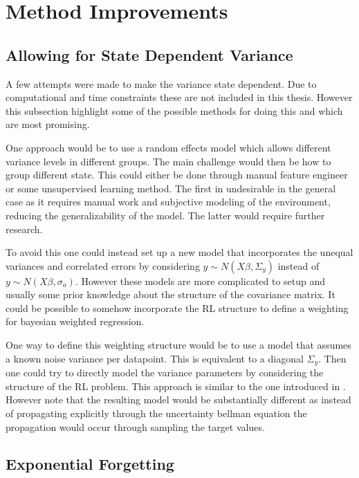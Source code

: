 \section{Method Improvements}

\subsection{Allowing for State Dependent Variance}

A few attempts were made to make the variance state dependent. Due to computational and time constraints these are not included in this thesis. However this subsection highlight some of the possible methods for doing this and which are most promising.

One approach would be to use a random effects model\citep[p.~382-383]{gelman_2013} which allows different variance levels in different groups. The main challenge would then be how to group different state. This could either be done through manual feature engineer or some unsupervised learning method. The first in undesirable in the general case as it requires manual work and subjective modeling of the environment, reducing the generalizability of the model. The latter would require further research.

To avoid this one could instead set up a new model that incorporates the unequal variances and correlated errors by considering $y \sim N(X\beta, \Sigma_y)$ instead of $y \sim N(X\beta, \sigma_a)$.  However these models are more complicated to setup and usually some prior knowledge about the structure of the covariance matrix. It could be possible to somehow incorporate the RL structure to define a weighting for bayesian weighted regression\citep[p.~370-373]{gelman_2013}. 

One way to define this weighting structure would be to use a model that assumes a known noise variance per datapoint. This is equivalent to a diagonal $\Sigma_y$. Then one could try to directly model the variance parameters by considering the structure of the RL problem. This approach is similar to the one introduced in \cite{donoghue_2017}. However note that the resulting model would be substantially different as instead of propagating explicitly through the uncertainty bellman equation the propagation would occur through sampling the target values.

\subsection{Exponential Forgetting}

